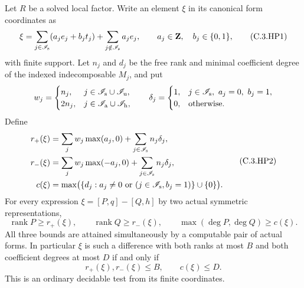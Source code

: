 \begin{proposition}
\label{C:henselian-minimal-form-bounds}
Let $R$ be a solved local factor.  Write an element $\xi$ in
its canonical form coordinates as
\[
 \xi=\sum_{j\in\mathscr I_{\rm s}}(a_j e_j+b_j t_j)
       +\sum_{j\notin\mathscr I_{\rm s}}a_j e_j,
 \qquad a_j\in\mathbf Z,\quad b_j\in\{0,1\},             \tag{C.3.HP1}
\]
with finite support.  Let $n_j$ and $d_j$ be the free rank
and minimal coefficient degree of the indexed indecomposable
$M_j$, and put
\[
 w_j=\begin{cases}
 n_j,&j\in\mathscr I_{\rm s}\cup\mathscr I_{\rm u},\\
 2n_j,&j\in\mathscr I_{\rm a}\cup\mathscr I_{\rm h},
 \end{cases}
 \qquad
 \delta_j=\begin{cases}
 1,&j\in\mathscr I_{\rm s},\ a_j=0,\ b_j=1,\\
 0,&\text{otherwise}.
 \end{cases}
\]
Define
\[
 \begin{split}
 r_+(\xi)&=\sum_jw_j\max(a_j,0)
                       +\sum_{j\in\mathscr I_{\rm s}}n_j\delta_j,\\
 r_-(\xi)&=\sum_jw_j\max(-a_j,0)
                       +\sum_{j\in\mathscr I_{\rm s}}n_j\delta_j,\\
 c(\xi)&=\max\bigl(\{d_j:a_j\ne0\text{ or }
                      (j\in\mathscr I_{\rm s},b_j=1)\}\cup\{0\}\bigr).
 \end{split}                                             \tag{C.3.HP2}
\]
For every expression $\xi=[P,q]-[Q,h]$ by two actual
symmetric representations,
\[
 \operatorname{rank}P\geq r_+(\xi),\qquad
 \operatorname{rank}Q\geq r_-(\xi),\qquad
 \max(\deg P,\deg Q)\geq c(\xi).
\]
All three bounds are attained simultaneously by a computable
pair of actual forms.  In particular $\xi$ is such a difference
with both ranks at most $B$ and both coefficient degrees at
most $D$ if and only if
\[
                    r_+(\xi),r_-(\xi)\leq B,
                    \qquad c(\xi)\leq D.                \tag{C.3.HP3}
\]
This is an ordinary decidable test from its finite coordinates.
\end{proposition}
